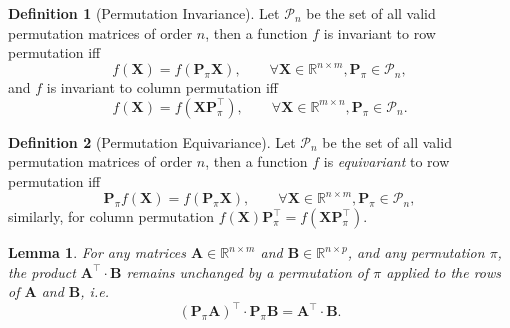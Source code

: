 \documentclass{article}
\newtheorem{lemma}[theorem]{Lemma}
\renewcommand{\vec}[1]{\mathbf{#1}}
\renewcommand{\o}{\cdot}
\renewcommand{\P}{\mathbf{P}}
\newcommand{\T}{\top}
\theoremstyle{definition}
\newtheorem{definition}{Definition}[section]
\newcommand{\Real}[1]{\mathbb{R}^{#1}}
\begin{document}
\begin{definition}[Permutation Invariance]
  Let $\mathcal{P}_n$ be the set of all valid permutation matrices of order $n$, then a function $f$ is invariant to row permutation iff
  \begin{equation}
    f(\vec{X}) = f(\P_\pi \vec{X}), \qquad \forall \vec{X} \in \Real{n \times m}, \P_\pi \in \mathcal{P}_n,
  \end{equation}
  and $f$ is invariant to column permutation iff
  \begin{equation}
    f(\vec{X}) = f(\vec{X} \P_\pi^\T), \qquad \forall \vec{X} \in \Real{m \times n}, \P_\pi \in \mathcal{P}_n.
  \end{equation}
\end{definition}

\begin{definition}[Permutation Equivariance]
  Let $\mathcal{P}_n$ be the set of all valid permutation matrices of order $n$, then a function $f$ is \emph{equivariant} to row permutation iff
  \begin{equation}
    \P_\pi f(\vec{X}) = f(\P_\pi \vec{X}), \qquad \forall \vec{X} \in \Real{n \times m}, \P_\pi \in \mathcal{P}_n,
  \end{equation}
  similarly, for column permutation $f(\vec{X}) \P_\pi^\T = f(\vec{X} \P_\pi^\T)$.
\end{definition}

\begin{lemma}
  \label{lma:dot}
  For any matrices $\vec{A} \in \Real{n \times m}$ and $\vec{B} \in \Real{n \times p}$, and any permutation $\pi$, the product $\vec{A}^\T \cdot \vec{B}$ remains unchanged by a permutation of $\pi$ applied to the rows of $\vec{A}$ and $\vec{B}$, i.e.
  \begin{equation}
    (\P_\pi \vec{A})^\top \o \P_\pi \vec{B} = \vec{A}^\top \o \vec{B}.
  \end{equation}
\end{lemma}

\newcommand{\pin}[1]{{\pi^{-1}{(#1)}}}
\end{document}
